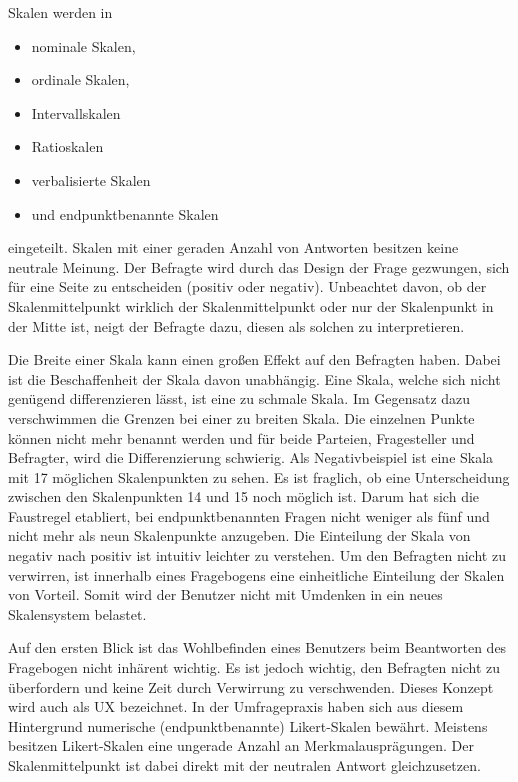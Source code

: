Skalen werden in 
\begin{itemize}
	\item nominale Skalen,
	\item ordinale Skalen,
	\item Intervallskalen
	\item Ratioskalen
	\item verbalisierte Skalen
	\item und endpunktbenannte Skalen
\end{itemize}

eingeteilt.\autocite[Vgl.][S. 71]{2014Fragebogen}
Skalen mit einer geraden Anzahl von Antworten besitzen keine neutrale Meinung. 
Der Befragte wird durch das Design der Frage gezwungen, sich für eine Seite zu entscheiden (positiv oder negativ).
Unbeachtet davon, ob der Skalenmittelpunkt wirklich der Skalenmittelpunkt oder nur der Skalenpunkt in der Mitte ist, neigt der Befragte dazu, diesen als solchen zu interpretieren.\autocite[Vgl.][S. 83]{2014Fragebogen}%

Die Breite einer Skala kann einen großen Effekt auf den Befragten haben.
Dabei ist die Beschaffenheit der Skala davon unabhängig.
Eine Skala, welche sich nicht genügend differenzieren lässt, ist eine zu schmale Skala.
Im Gegensatz dazu verschwimmen die Grenzen bei einer zu breiten Skala.
Die einzelnen Punkte können nicht mehr benannt werden und für beide Parteien, Fragesteller und Befragter, wird die Differenzierung schwierig. \newline
Als Negativbeispiel ist eine Skala mit 17 möglichen Skalenpunkten zu sehen.
Es ist fraglich, ob eine Unterscheidung zwischen den Skalenpunkten 14 und 15 noch möglich ist.
Darum hat sich die Faustregel etabliert, bei endpunktbenannten Fragen nicht weniger als fünf und nicht mehr als neun Skalenpunkte anzugeben.\autocite[Vgl.][S. 87]{2014Fragebogen} %
Die Einteilung der Skala von negativ nach positiv ist intuitiv leichter zu verstehen.
Um den Befragten nicht zu verwirren, ist innerhalb eines Fragebogens eine einheitliche Einteilung der Skalen von Vorteil.
Somit wird der Benutzer nicht mit Umdenken in ein neues Skalensystem belastet.\autocite[Vgl.][S. 89 f]{2014Fragebogen} %

Auf den ersten Blick ist das Wohlbefinden eines Benutzers beim Beantworten des Fragebogen nicht inhärent wichtig. 
Es ist jedoch wichtig, den Befragten nicht zu überfordern und keine Zeit durch Verwirrung zu verschwenden. 
Dieses Konzept wird auch als \acf*{UX} bezeichnet.
In der Umfragepraxis haben sich aus diesem Hintergrund numerische (endpunktbenannte) Likert-Skalen bewährt.\autocite[Vgl.][]{Likert} 
Meistens besitzen Likert-Skalen eine ungerade Anzahl an Merkmalausprägungen.
Der Skalenmittelpunkt ist dabei direkt mit der neutralen Antwort gleichzusetzen.\autocite[Vgl.][]{ISO}

